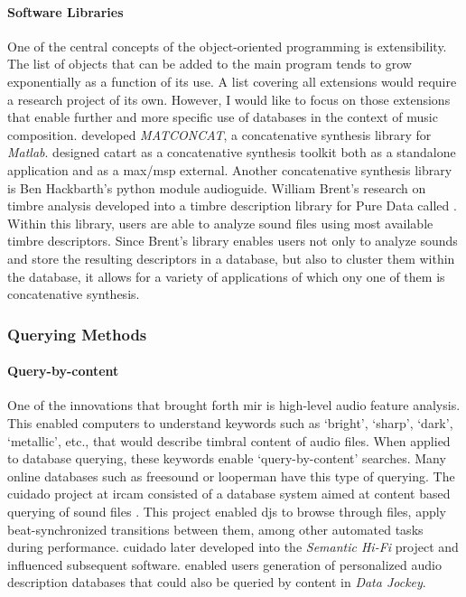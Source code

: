 \paragraph{Software Libraries}
One of the central concepts of the object-oriented programming is extensibility. The list of objects that can be added to the main program tends to grow exponentially as a function of its use. A list covering all extensions would require a research project of its own. However, I would like to focus on those extensions that enable further and more specific use of databases in the context of music composition. \textcite{Stu04:Mat} developed \textit{MATCONCAT}, a concatenative synthesis library for \textit{Matlab}. \textcite{Sch06:Rea} designed \gls{catart} as a concatenative synthesis toolkit both as a standalone application and as a \gls{max/msp} external. Another concatenative synthesis library is Ben Hackbarth's python module \gls{audioguide}. William Brent's research on timbre analysis developed into a timbre description library for Pure Data called  \parencite{icmc/bbp2372.2010.044}. Within this library, users are able to analyze sound files using most available timbre descriptors. Since Brent's library enables users not only to analyze sounds and store the resulting descriptors in a database, but also to cluster them within the database, it allows for a variety of applications of which ony one of them is concatenative synthesis.

\subsubsection{Querying Methods}

\paragraph{Query-by-content}
One of the innovations that brought forth \gls{mir} is high-level audio feature analysis. This enabled computers to understand keywords such as `bright', `sharp', `dark', `metallic', etc., that would describe timbral content of audio files. When applied to database querying, these keywords enable `query-by-content' searches. Many online databases such as \gls{freesound} or \gls{looperman} have this type of querying. The \gls{cuidado} project at \gls{ircam} consisted of a database system aimed at content based querying of sound files \parencites{DBLP:conf/ismir/VinetHP02}{DBLP:conf/icmc/VinetHP02}{DBLP:conf/icmc/Vinet05}. This project enabled \glspl{dj} to browse through files, apply beat-synchronized transitions between them, among other automated tasks during performance. \gls{cuidado} later developed into the \textit{Semantic Hi-Fi} project and influenced subsequent software. \textcite{icmc/bbp2372.2007.117} enabled users generation of personalized audio description databases that could also be queried by content in \textit{Data Jockey}.

